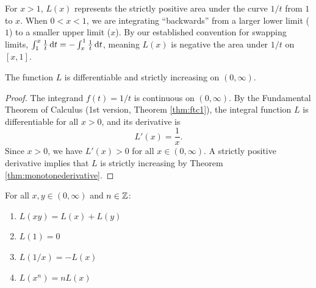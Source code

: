 \documentclass[../analysis1.tex]{subfiles}
\begin{document}
\begin{remark}
    For $x > 1$, $L(x)$ represents the strictly positive area under the curve $1/t$ from $1$ to $x$. When $0 < x < 1$, we are integrating ``backwards'' from a larger lower limit ($1$) to a smaller upper limit ($x$). By our established convention for swapping limits, $\int_1^x \frac{1}{t} \d{t} = -\int_x^1 \frac{1}{t} \d{t}$, meaning $L(x)$ is negative the area under $1/t$ on $[x, 1]$. 
\end{remark}

\begin{theorem}
    \begin{shaded*}
        The function $L$ is differentiable and strictly increasing on $(0, \infty)$.
    \end{shaded*}
\end{theorem}

\begin{proof}
    The integrand $f(t) = 1/t$ is continuous on $(0, \infty)$. By the Fundamental Theorem of Calculus (1st version, Theorem \ref{thm:ftc1}), the integral function $L$ is differentiable for all $x > 0$, and its derivative is
    \[
        L'(x) = \frac{1}{x}.
    \]
    Since $x > 0$, we have $L'(x) > 0$ for all $x \in (0, \infty)$. A strictly positive derivative implies that $L$ is strictly increasing by Theorem \ref{thm:monotonederivative}.\qedhere
\end{proof}

\begin{theorem}
    \begin{shaded*}
        For all $x, y \in (0, \infty)$ and $n \in \mathbb{Z}$:
        \begin{enumerate}
            \item $L(xy) = L(x) + L(y)$
            \item $L(1) = 0$
            \item $L(1/x) = -L(x)$
            \item $L(x^n) = nL(x)$
        \end{enumerate}
    \end{shaded*}
\end{theorem}
\end{document}
